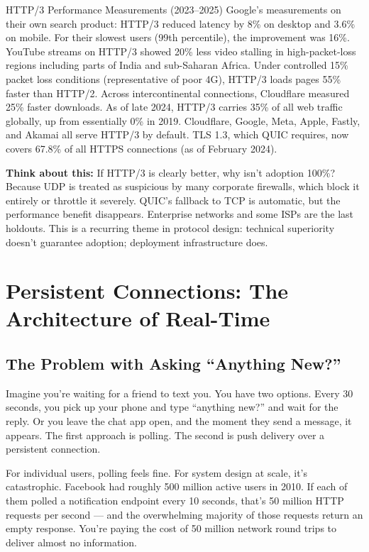 \documentclass[11pt,a4paper]{article}
\begin{document}
\begin{industrybox}{HTTP/3 Performance Measurements (2023--2025)}
Google's measurements on their own search product: HTTP/3 reduced latency by 8\% on desktop and 3.6\% on mobile. For their slowest users (99th percentile), the improvement was 16\%. YouTube streams on HTTP/3 showed 20\% less video stalling in high-packet-loss regions including parts of India and sub-Saharan Africa. Under controlled 15\% packet loss conditions (representative of poor 4G), HTTP/3 loads pages 55\% faster than HTTP/2. Across intercontinental connections, Cloudflare measured 25\% faster downloads. As of late 2024, HTTP/3 carries 35\% of all web traffic globally, up from essentially 0\% in 2019. Cloudflare, Google, Meta, Apple, Fastly, and Akamai all serve HTTP/3 by default. TLS 1.3, which QUIC requires, now covers 67.8\% of all HTTPS connections (as of February 2024).
\end{industrybox}

\begin{thinkbox}
\textbf{Think about this:} If HTTP/3 is clearly better, why isn't adoption 100\%? Because UDP is treated as suspicious by many corporate firewalls, which block it entirely or throttle it severely. QUIC's fallback to TCP is automatic, but the performance benefit disappears. Enterprise networks and some ISPs are the last holdouts. This is a recurring theme in protocol design: technical superiority doesn't guarantee adoption; deployment infrastructure does.
\end{thinkbox}

\section{Persistent Connections: The Architecture of Real-Time}

\subsection{The Problem with Asking ``Anything New?''}

Imagine you're waiting for a friend to text you. You have two options. Every 30 seconds, you pick up your phone and type ``anything new?'' and wait for the reply. Or you leave the chat app open, and the moment they send a message, it appears. The first approach is polling. The second is push delivery over a persistent connection.

For individual users, polling feels fine. For system design at scale, it's catastrophic. Facebook had roughly 500 million active users in 2010. If each of them polled a notification endpoint every 10 seconds, that's 50 million HTTP requests per second --- and the overwhelming majority of those requests return an empty response. You're paying the cost of 50 million network round trips to deliver almost no information.
\end{document}
